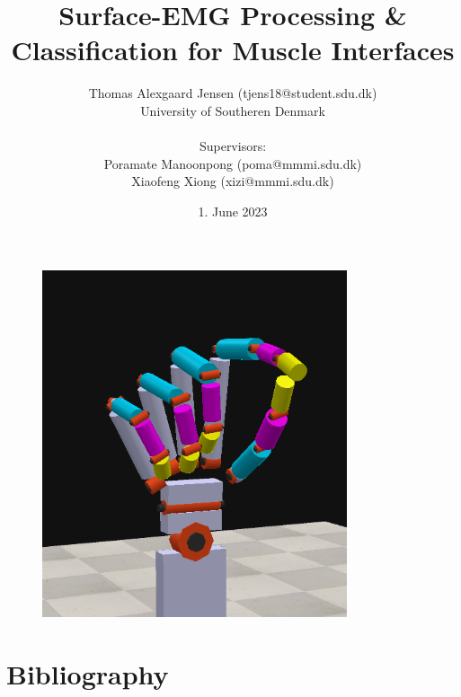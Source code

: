 \documentclass[a4paper, 12pt]{article}
\title{\textbf{Surface-EMG Processing \& Classification for Muscle Interfaces}}
\author{Thomas Alexgaard Jensen (tjens18@student.sdu.dk)
\\University of Southeren Denmark
\\
\\Supervisors: 
\\Poramate Manoonpong (poma@mmmi.sdu.dk)
\\Xiaofeng Xiong (xizi@mmmi.sdu.dk)
}
\date{1. June 2023}
\begin{document}
\thispagestyle{empty}
\maketitle
\thispagestyle{empty}
\begin{figure}[h]
\begin{center}
\includegraphics[width=0.8\textwidth]{pulppinch_grip.png}
\end{center}
\end{figure}


\newpage


\setcounter{page}{1}

\newpage

\newpage

\printglossary
\newpage

\tableofcontents
\newpage


\newpage

\newpage

\newpage

\newpage

\newpage

\newpage

\newpage

\section{Bibliography}
\listoffigures
\listoftables
\end{document}
